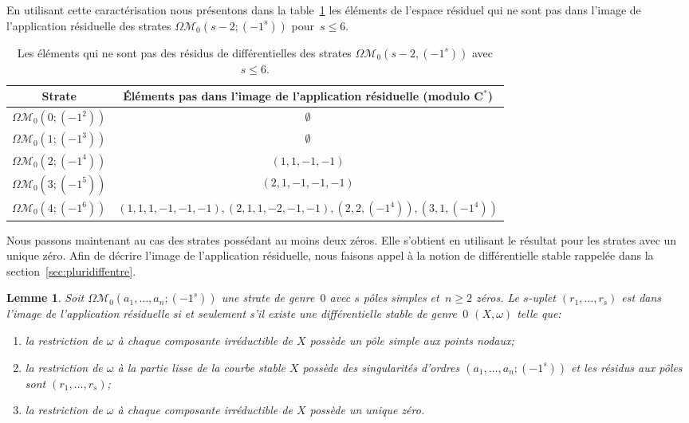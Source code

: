 \documentclass[11pt]{article}
\newcommand{\smaller}{\small}
\numberwithin{equation}{section}\renewcommand{\proofname}{Démonstration}
\let\mathcal\mathscr
\newcommand{\CC}{\mathbf{C}}
\newcommand{\omoduli}[1][g]{{\Omega\mathcal M}_{\!#1}}
\newtheorem{lem}[thm]{Lemme}
\theoremstyle{definition}
\begin{document}
En utilisant cette caractérisation nous présentons dans la table~\ref{tab:noim} les éléments de l'espace résiduel qui ne sont pas dans l'image de l'application résiduelle des strates $\omoduli[0](s-2;(-1^{s}))$ pour~$s\leq6$.
\par
\begin{table}[ht]
\smaller\renewcommand{\arraystretch}{1.3}
\begin{tabular}{|c|c|}
\hline
Strate & Éléments pas dans l'image de l'application résiduelle (modulo $\CC^{\ast}$)
\\
\hline
$\omoduli[0](0;(-1^{2}))$ & $\emptyset$ \\
\hline
$\omoduli[0](1;(-1^{3}))$ & $\emptyset$ \\
\hline
$\omoduli[0](2;(-1^{4}))$ & $(1,1,-1,-1)$ \\
\hline
$\omoduli[0](3;(-1^{5}))$ & $(2,1,-1,-1,-1)$ \\
\hline
$\omoduli[0](4;(-1^{6}))$& $(1,1,1,-1,-1,-1), (2,1,1,-2,-1,-1), (2,2,(-1^{4})), (3,1,(-1^{4}))$ \\
\hline
\end{tabular}
\vspace*{\baselineskip}
\caption{\label{tab:noim}Les éléments qui ne sont pas des résidus de différentielles des strates $\omoduli[0](s-2,(-1^{s}))$ avec $s\leq6$.}
\end{table}

Nous passons maintenant au cas des strates possédant au moins deux zéros. Elle s'obtient en utilisant le résultat pour les strates avec un unique zéro. Afin de décrire l'image de l'application résiduelle, nous faisons appel à la notion de différentielle stable rappelée dans la section~\ref{sec:pluridiffentre}.

\begin{lem}\label{lm:g0p-1plusieurszero}
Soit $\omoduli[0](a_{1},\dots,a_{n};(-1^{s}))$ une strate de genre~$0$ avec $s$ pôles simples et~$n\geq2$ zéros. Le $s$-uplet $(r_{1},\ldots,r_{s})$ est dans l'image de l'application résiduelle si et seulement s'il existe une différentielle stable de genre~$0$ $(X,\omega)$ telle que:
\begin{enumerate}
\item la restriction de $\omega$ à chaque composante irréductible de $X$ possède un pôle simple aux points nodaux;
\item la restriction de $\omega$ à la partie lisse de la courbe stable $X$ possède des singularités d'ordres $(a_{1},\dots,a_{n};(-1^{s}))$ et les résidus aux pôles sont $(r_{1},\dots,r_{s})$;
\item la restriction de $\omega$ à chaque composante irréductible de $X$ possède un unique zéro.
\end{enumerate}
\end{lem}
\end{document}
